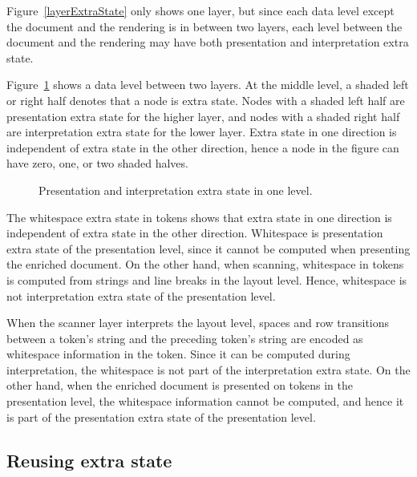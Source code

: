 Figure~\ref{layerExtraState} only shows one layer, but since each data level except the document and the rendering is in between two layers, each level between the document and the rendering may have both presentation and interpretation extra state. 

Figure~\ref{levelExtraState} shows a data level between two layers. At the middle level, a shaded left or right half denotes that a node is extra state. Nodes with a shaded left half are presentation extra state for the higher layer, and nodes with a shaded right half are interpretation extra state for the lower layer. Extra state in one direction is independent of extra state in the other direction, hence a node in the figure can have zero, one, or two shaded halves.

\begin{figure}
\begin{center}
\begin{center}
\end{center}
\caption{Presentation and interpretation extra state in one level.}\label{levelExtraState} 
\end{center}
\end{figure}

The whitespace extra state in tokens shows that extra state in one direction is independent of extra state in the other direction. Whitespace is presentation extra state of the presentation level, since it cannot be computed when presenting the enriched document. On the other hand, when scanning, whitespace in tokens is computed from strings and line breaks in the layout level. Hence, whitespace is not interpretation extra state of the presentation level.



\bc
When the scanner layer interprets the layout level, spaces and row transitions between a token's string and the preceding token's string are encoded as whitespace information in the token. Since it can be computed during interpretation, the whitespace is not part of the interpretation extra state. On the other hand, when the enriched document is presented on tokens in the presentation level, the whitespace information cannot be computed, and hence it is part of the presentation extra state of the presentation level.
\ec

\subsection{Reusing extra state}

